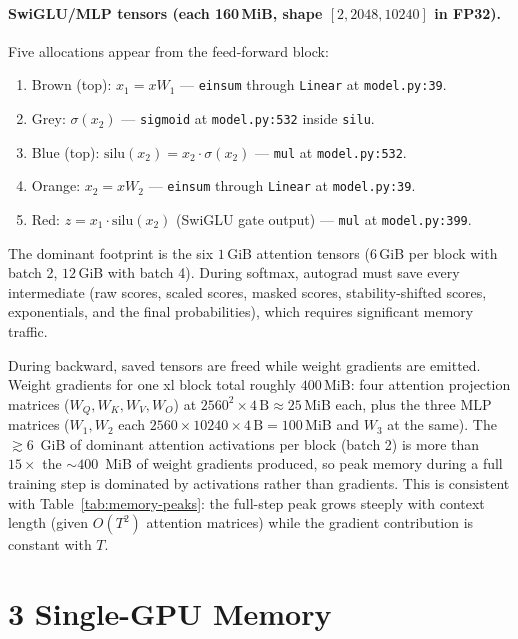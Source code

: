 \documentclass[11pt]{article}
\begin{document}
\paragraph{SwiGLU/MLP tensors (each 160\,MiB, shape $[2,2048,10240]$ in FP32).}
Five allocations appear from the feed-forward block:
\begin{enumerate}
  \item Brown (top): $x_1=xW_1$ --- \texttt{einsum} through \texttt{Linear} at \texttt{model.py:39}.
  \item Grey: $\sigma(x_2)$ --- \texttt{sigmoid} at \texttt{model.py:532} inside \texttt{silu}.
  \item Blue (top): $\mathrm{silu}(x_2)=x_2\cdot\sigma(x_2)$ --- \texttt{mul} at \texttt{model.py:532}.
  \item Orange: $x_2=xW_2$ --- \texttt{einsum} through \texttt{Linear} at \texttt{model.py:39}.
  \item Red: $z=x_1\cdot\mathrm{silu}(x_2)$ (SwiGLU gate output) --- \texttt{mul} at \texttt{model.py:399}.
\end{enumerate}

The dominant footprint is the six $1$\,GiB attention tensors ($6$\,GiB per block with batch 2, $12$\,GiB with batch 4). During softmax, autograd must save every intermediate (raw scores, scaled scores, masked scores, stability-shifted scores, exponentials, and the final probabilities), which requires significant memory traffic.

During backward, saved tensors are freed while weight gradients are emitted. Weight gradients for one xl block total roughly $400$\,MiB: four attention projection matrices ($W_Q,W_K,W_V,W_O$) at $2560^2\times 4\,\text{B}\approx25$\,MiB each, plus the three MLP matrices ($W_1,W_2$ each $2560\times 10240\times 4\,\text{B}=100$\,MiB and $W_3$ at the same). The ${\gtrsim}6$\, GiB of dominant attention activations per block (batch 2) is more than $15\times$ the ${\sim}400$\, MiB of weight gradients produced, so peak memory during a full training step is dominated by activations rather than gradients. This is consistent with Table~\ref{tab:memory-peaks}: the full-step peak grows steeply with context length (given $O(T^2)$ attention matrices) while the gradient contribution is constant with $T$.

\section*{3 Single-GPU Memory}
\end{document}
